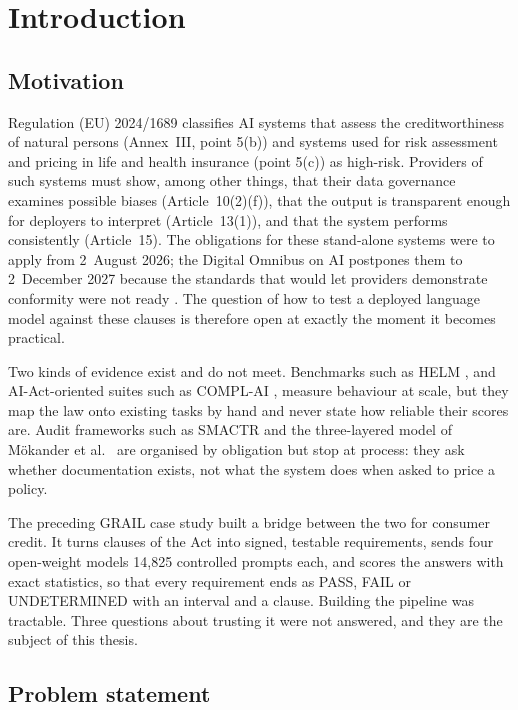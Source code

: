 \chapter{Introduction}
\label{ch:introduction}

\section{Motivation}
Regulation (EU) 2024/1689 \citep{euaiact2024} classifies AI systems that assess the creditworthiness of natural persons (Annex~III, point 5(b)) and systems used for risk assessment and pricing in life and health insurance (point 5(c)) as high-risk. Providers of such systems must show, among other things, that their data governance examines possible biases (Article~10(2)(f)), that the output is transparent enough for deployers to interpret (Article~13(1)), and that the system performs consistently (Article~15). The obligations for these stand-alone systems were to apply from 2~August 2026; the Digital Omnibus on AI postpones them to 2~December 2027 because the standards that would let providers demonstrate conformity were not ready \citep{omnibus}. The question of how to test a deployed language model against these clauses is therefore open at exactly the moment it becomes practical.

Two kinds of evidence exist and do not meet. Benchmarks such as HELM \citep{helm}, and AI-Act-oriented suites such as COMPL-AI \citep{complai}, measure behaviour at scale, but they map the law onto existing tasks by hand and never state how reliable their scores are. Audit frameworks such as SMACTR \citep{smactr} and the three-layered model of M\"okander et al.\ \citep{mokander} are organised by obligation but stop at process: they ask whether documentation exists, not what the system does when asked to price a policy.

The preceding GRAIL case study built a bridge between the two for consumer credit. It turns clauses of the Act into signed, testable requirements, sends four open-weight models 14{,}825 controlled prompts each, and scores the answers with exact statistics, so that every requirement ends as PASS, FAIL or UNDETERMINED with an interval and a clause. Building the pipeline was tractable. Three questions about trusting it were not answered, and they are the subject of this thesis.

\section{Problem statement}
